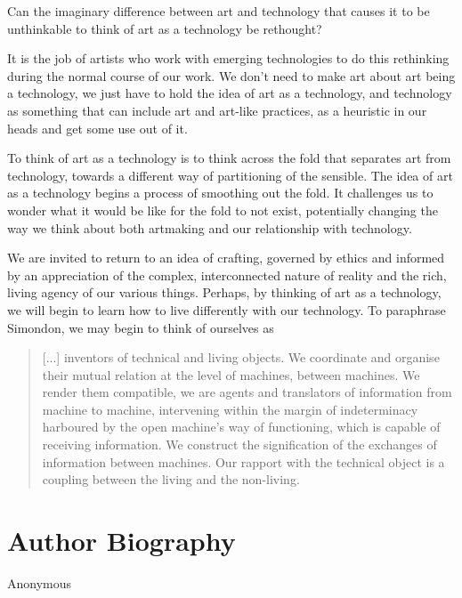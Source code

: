\documentclass[letterpaper]{article}
\begin{document}
    Can the imaginary difference between art and technology that causes it to be unthinkable to think of art as a technology be rethought?
    
    It is the job of artists who work with emerging technologies to do this rethinking during the normal course of our work. We don't need to make art about art being a technology, we just have to hold the idea of art as a technology, and technology as something that can include art and art-like practices, as a heuristic in our heads and get some use out of it.
    
    To think of art as a technology is to think across the fold that separates art from technology, towards a different way of partitioning of the sensible. The idea of art as a technology begins a process of smoothing out the fold. It challenges us to wonder what it would be like for the fold to not exist, potentially changing the way we think about both artmaking and our relationship with technology.
    
    We are invited to return to an idea of crafting, governed by ethics and informed by an appreciation of the complex, interconnected nature of reality and the rich, living agency of our various things. Perhaps, by thinking of art as a technology, we will begin to learn how to live differently with our technology. To paraphrase Simondon, we may begin to think of ourselves as
    
    \begin{quote}
        [...] inventors of technical and living objects. We coordinate and organise their mutual relation at the level of machines, between machines. We render them compatible, we are agents and translators of information from machine to machine, intervening within the margin of indeterminacy harboured by the open machine's way of functioning, which is capable of receiving information. We construct the signification of the exchanges of information between machines. Our rapport with the technical object is a coupling between the living and the non-living. \citep[p.xvi]{SimondonOnThMdOfExstncOfTechnclObjcts1980}
    \end{quote}




\section{Author Biography}

Anonymous 
\end{document}
